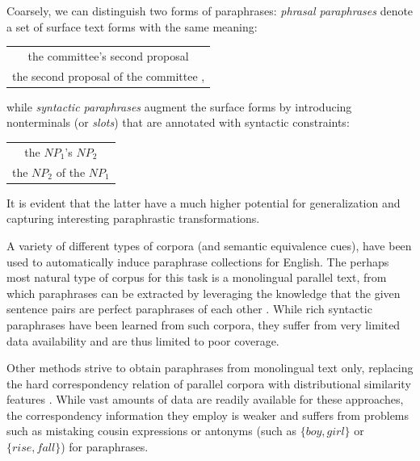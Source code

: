 \documentclass[11pt]{article}
\begin{document}
Coarsely, we can distinguish two forms of paraphrases: \emph{phrasal
  paraphrases} denote a set of surface text forms with the same
meaning:
\begin{center}
\begin{tabular}{c}
the committee's second proposal \\
the second proposal of the committee ,
\end{tabular}
\end{center}
while \emph{syntactic paraphrases} augment the surface forms by
introducing nonterminals (or \emph{slots}) that are annotated with
syntactic constraints:
\begin{center}
\begin{tabular}{c}
the $\mathit{NP}_1$'s $\mathit{NP}_2$ \\
the $\mathit{NP}_2$ of the $\mathit{NP}_1$
\end{tabular}
\end{center}
It is evident that the latter have a much higher potential for
generalization and capturing interesting paraphrastic transformations.

A variety of different types of corpora (and semantic equivalence
cues), have been used to automatically induce paraphrase collections
for English. The perhaps most natural type of corpus for this task is
a monolingual parallel text, from which paraphrases can be extracted
by leveraging the knowledge that the given sentence pairs are perfect
paraphrases of each other \cite{Barzilay1999,Pang2003}. While rich
syntactic paraphrases have been learned from such corpora, they suffer
from very limited data availability and are thus limited to poor
coverage.

Other methods strive to obtain paraphrases from monolingual text only,
replacing the hard correspondency relation of parallel corpora with
distributional similarity features \cite{Lin2001,Bhagat2008}. While
vast amounts of data are readily available for these approaches, the
correspondency information they employ is weaker and suffers from
problems such as mistaking cousin expressions or antonyms (such as
$\{\mathit{boy}, \mathit{girl}\}$ or $\{\mathit{rise},
\mathit{fall}\}$) for paraphrases.
\end{document}
